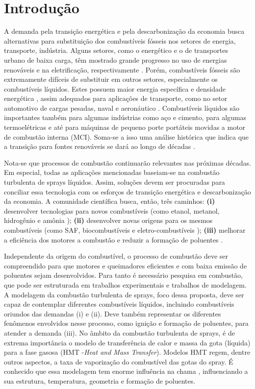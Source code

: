 \section{Introdução} \label{sec:intro}

A demanda pela transição energética e pela descarbonização da economia busca alternativas para substituição dos combustíveis fósseis nos setores de energia, transporte, indústria. 
Alguns setores, como o energético e o de transportes urbano de baixa carga, têm mostrado grande progresso no uso de energias renováveis e na eletrificação, respectivamente \cite{MasriA2021}. 
Porém, combustíveis fósseis são extremamente difíceis de substituir em outros setores, especialmente os combustíveis líquidos.
Estes possuem maior energia específica e densidade energética \cite{Bergthorson2017,Julien2017}, assim adequados para aplicações de transporte, como no setor automotivo de cargas pesadas, naval e aeronáutico \cite{MasriA2021}.
Combustíveis líquidos são importantes também para algumas indústrias como aço e cimento, para algumas termoelétricas e até para máquinas de pequeno porte portáteis movidas a motor de combustão interna (MCI).
Soma-se a isso uma análise histórica que indica que a transição para fontes renováveis se dará ao longo de décadas \cite{MasriA2021}.

Nota-se que processos de combustão continuarão relevantes nas próximas décadas.
Em especial, todas as aplicações mencionadas baseiam-se na combustão turbulenta de sprays líquidos.
Assim, soluções devem ser procuradas para conciliar essa tecnologia com os esforços de transição energética e descarbonização da economia.
A comunidade científica busca, então, três caminhos: \textbf{(i)} desenvolver tecnologias para novos combustíveis (como  etanol, metanol, hidrogênio e amônia \cite{FAPESP_etanol_1,VerhelstS2019,TeohY2023,ElbazA2022}); \textbf{(ii)} desenvolver novas origens para os mesmos combustíveis (como SAF, biocombustíveis e eletro-combustíveis \cite{BenJames-SAF,BergthorsonJ2015,WestbrookC2019,PalysM2022}); \textbf{(iii)} melhorar a eficiência dos motores a combustão e reduzir a formação de poluentes \cite{MasriA2021}.

Independente da origem do combustível, o processo de combustão deve ser compreendido para que motores e queimadores eficientes e com baixa emissão de poluentes sejam desenvolvidos.
Para tanto é necessário pesquisa em combustão, que pode ser estruturada em trabalhos experimentais e trabalhos de modelagem.
A modelagem da combustão turbulenta de sprays, foco dessa proposta, deve ser capaz de contemplar diferentes combustíveis líquidos, incluindo combustíveis oriundos das demandas (i) e (ii).
Deve também representar os diferentes fenômenos envolvidos nesse processo, como ignição e formação de poluentes, para atender a demanda (iii).
No âmbito da combustão turbulenta de sprays, é de extrema importância o modelo de transferência de calor e massa da gota (líquida) para a fase gasosa (HMT -\emph{Heat and Mass Transfer}).
Modelos HMT regem, dentre outros aspectos, a taxa de vaporização do combustível das gotas do spray.
É conhecido que essa modelagem tem enorme influência na chama \cite{JennyB2012}, influenciando a sua estrutura, temperatura, geometria e formação de poluentes.


